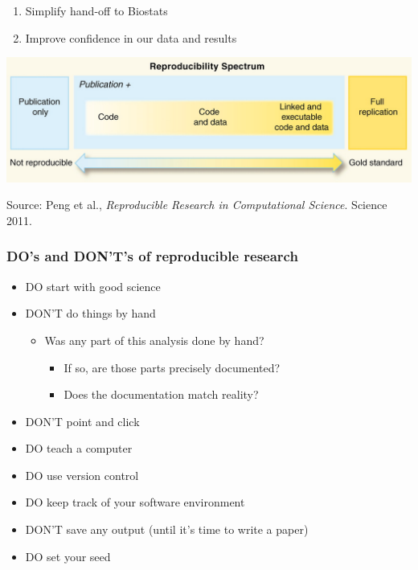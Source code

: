 \documentclass[openany]{article}
\providecommand{\tightlist}{%
  \setlength{\itemsep}{0pt}\setlength{\parskip}{0pt}}
\begin{document}
\begin{enumerate}
\def\labelenumi{\arabic{enumi}.}
\setcounter{enumi}{1}
\item
  Simplify hand-off to Biostats
\item
  Improve confidence in our data and results
\end{enumerate}

\includegraphics{images/reprodresearch.jpg}

Source: Peng et al., \emph{Reproducible Research in Computational Science}. Science 2011.

\hypertarget{dos-and-donts-of-reproducible-research}{%
\subsubsection{DO's and DON'T's of reproducible research}\label{dos-and-donts-of-reproducible-research}}

\begin{itemize}
\tightlist
\item
  DO start with good science
\item
  DON'T do things by hand

  \begin{itemize}
  \tightlist
  \item
    Was any part of this analysis done by hand?

    \begin{itemize}
    \tightlist
    \item
      If so, are those parts precisely documented?
    \item
      Does the documentation match reality?
    \end{itemize}
  \end{itemize}
\item
  DON'T point and click
\item
  DO teach a computer
\item
  DO use version control
\item
  DO keep track of your software environment
\item
  DON'T save any output (until it's time to write a paper)
\item
  DO set your seed
\end{itemize}
\end{document}
